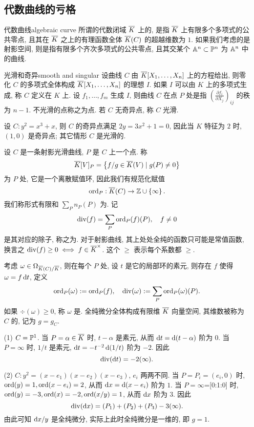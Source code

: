 \subsection{代数曲线的亏格}

\begin{definition}{代数曲线}{algebraic curve}
所谓的代数闭域 $\overline K$ 上的, 是指 $\overline K$ 上有限多个多项式的公共零点, 且其在 $\overline K$ 之上的有理函数全体 $\overline K(C)$ 的超越维数为 $1$. 如果我们考虑的是射影空间, 则是指有限多个齐次多项式的公共零点, 且其交某个 ${\mathbb{A}}^n\subset {\mathbb{P}}^n$ 为 ${\mathbb{A}}^n$ 中的曲线.
\end{definition}

\begin{definition}{光滑和奇异}{smooth and singular}
设曲线 $C$ 由 $\overline K[X_1,\dots,X_n]$ 上的方程给出, 则零化 $C$ 的多项式全体构成 $\overline K[X_1,\dots,X_n]$ 的理想 $I$. 如果 $I$ 可以由 $K$ 上的多项式生成, 称 $C$ 定义在 $K$ 上.
设 $f_1,\dots,f_m$ 生成 $I$, 则曲线 $C$ 在点 $P$ 处是指 $\left(\frac{\partial f_i}{\partial X_j}\right)_{ij}$ 的秩为 $n-1$. 不光滑的点称之为点. 若 $C$ 无奇异点, 称 $C$ 光滑.
\end{definition}

\begin{example}
设 $C: y^2=x^3+x$, 则 $C$ 的奇异点满足 $2y=3x^2+1=0$, 因此当 $K$ 特征为 $2$ 时, $(1,0)$ 是奇异点; 其它情形 $C$ 是光滑的.
\end{example}

设 $C$ 是一条射影光滑曲线, $P$ 是 $C$ 上一个点. 称
  \[\overline K[V]_P=\left\{f/g\in\overline K(V)\mid g(P)\neq 0\right\}\]
为 $P$ 处, 它是一个离散赋值环, 因此我们有规范化赋值
  \[{\mathrm{ord}}_P:\overline K(C)\to {\mathbb{Z}}\cup\left\{\infty\right\}.\]
我们称形式有限和 $\sum_P n_P(P)$ 为.
记
  \[{\mathrm{div}}(f)=\sum_P {\mathrm{ord}}_P(f)(P),\quad f\neq 0\]
是其对应的除子, 称之为. 对于射影曲线, 其上处处全纯的函数只可能是常值函数, 换言之 ${\mathrm{div}}(f)\ge 0\iff f\in \overline K^\times$. 这个 $\ge$ 表示每个系数都 $\ge$.

考虑 $\omega\in \Omega_{\overline K(C)/\overline K}$, 则在每个 $P$ 处, 设 $t$ 是它的局部环的素元, 则存在 $f$ 使得 $\omega=f\mathop{}\!\mathrm{d} t$, 定义
  \[{\mathrm{ord}}_P(\omega):={\mathrm{ord}}_P(f),\quad {\mathrm{div}}(\omega):=\sum_P {\mathrm{ord}}_P(\omega)(P).\]
如果 $\div(\omega)\ge 0$, 称 $\omega$ 是. 全纯微分全体构成有限维 $\overline K$ 向量空间, 其维数被称为 $C$ 的, 记为 $g=g_C$.

\begin{example}
(1) $C={\mathbb{P}}^1$. 当 $P=\alpha\in\overline K$ 时, $t-\alpha$ 是素元, 从而 $\mathop{}\!\mathrm{d} t=\mathop{}\!\mathrm{d} (t-\alpha)$ 阶为 $0$. 当 $P=\infty$ 时, $1/t$ 是素元, $\mathop{}\!\mathrm{d} t=-t^{-2}\mathop{}\!\mathrm{d} (1/t)$ 阶为 $-2$. 因此
  \[{\mathrm{div}}(\mathop{}\!\mathrm{d} t)=-2(\infty).\]

(2) $C:y^2=(x-e_1)(x-e_2)(x-e_3)$, $e_i$ 两两不同. 当 $P=P_i=(e_i,0)$ 时, ${\mathrm{ord}}(y)=1,{\mathrm{ord}}(x-e_i)=2$, 从而 $\mathop{}\!\mathrm{d} x=\mathop{}\!\mathrm{d} (x-e_i)$ 阶为 $1$. 当 $P=\infty$=[0:1:0] 时, ${\mathrm{ord}}(y)=-3,{\mathrm{ord}}(x)=-2,{\mathrm{ord}}(x/y)=1$, 从而 $\mathop{}\!\mathrm{d} x$ 阶为 $3$. 因此
  \[{\mathrm{div}}(\mathop{}\!\mathrm{d} x)=(P_1)+(P_2)+(P_3)-3(\infty).\]
由此可知 $\mathop{}\!\mathrm{d} x/y$ 是全纯微分, 实际上此时全纯微分是一维的, 即 $g=1$.
\end{example}


